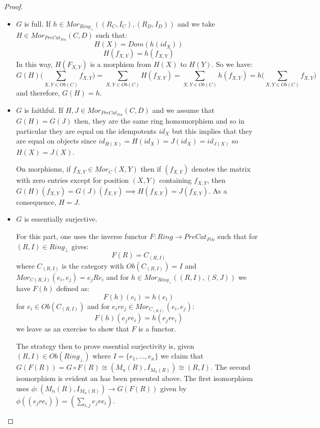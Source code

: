 \begin{proof}
\begin{itemize}
\item $G$ is full. If $h \in Mor_{Ring_\perp}((R_C,I_C),(R_D,I_D))$ and we take $H \in Mor_{PreCat_{Fin}}(C,D)$ such that: $$H(X) = Dom(h(id_X))$$ $$H(f_{X,Y}) = h(f_{X,Y})$$ In this way, $H(F_{X,Y})$ is a morphism from $H(X)$ to $H(Y)$. So we have: $$G(H)\Big(\sum_{X,Y \in Ob(C)} f_{X,Y}\Big) = \sum_{X,Y \in Ob(C)} H(f_{X,Y}) = \sum_{X,Y \in Ob(C)} h(f_{X,Y}) = h\Big(\sum_{X,Y \in Ob(C)} f_{X,Y}\Big)$$ and therefore, $G(H) = h$. 

\item $G$ is faithful. If $H,J \in Mor_{PreCat_{Fin}}(C,D)$ and we assume that $G(H) = G(J)$ then, they are the same ring homomorphism and so in particular they are equal on the idempotents $id_X$ but this implies that they are equal on objects since $ id_{H(X)} = H(id_X)  = J(id_X) = id_{J(X)}$ so $H(X) = J(X)$. 

On morphisms, if $f_{X,Y} \in Mor_C(X,Y)$ then if $(f_{X,Y})$ denotes the matrix with zero entries except for position $(X,Y)$ containing $f_{X,Y}$, then $G(H)(f_{X,Y}) = G(J)(f_{X,Y}) \implies H(f_{X,Y}) = J(f_{X,Y})$. As a consequence, $H = J$. 

\item $G$ is essentially surjective.

For this part, one uses the inverse functor $F:Ring \to PreCat_{Fin}$ such that for $(R,I) \in Ring_{\perp}$ gives: $$F(R) = C_{(R,I)}$$ where $C_{(R,I)}$ is the category with $Ob(C_{(R,I)}) = I$ and $Mor_{C(R,I)}(e_i, e_j) = e_jRe_i$ and for $h \in Mor_{Ring_{\perp}}((R,I),(S,J))$ we have $F(h)$ defined as: $$F(h)(e_i) = h(e_i)$$ for $e_i \in Ob(C_{(R,I)})$ and for $e_ire_j \in Mor_{C_(R,I)}(e_i,e_j)$: $$F(h)(e_jre_i) = h(e_jre_i)$$ we leave as an exercise to show that $F$ is a functor. 

The strategy then to prove essential surjectivity is, given $(R,I) \in Ob(Ring_{\perp})$ where $I = \{e_1,\ldots,e_n\}$ we claim that $G(F(R)) = G \circ F(R) \cong (M_n(R),I_{M_n(R)}) \cong (R,I)$. The second isomorphism is evident an has been presented above. The first isomorphism uses $\phi:(M_n(R),I_{M_n(R)}) \to G(F(R))$ given by $\phi((e_jre_i)) = (\sum_{i,j} e_jre_i)$.
\end{itemize}

\end{proof}

